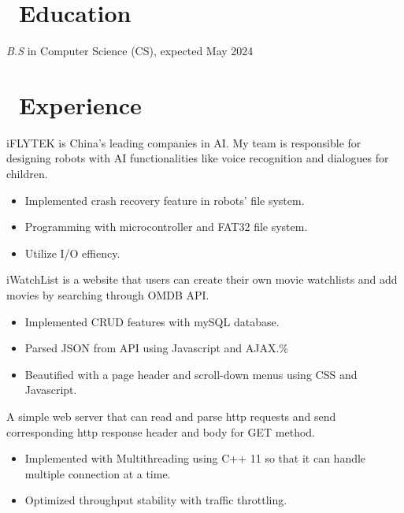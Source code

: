 \documentclass{resume}
\begin{document}



\section{\faGraduationCap\ Education}
\textit{B.S} in Computer Science (CS), expected May 2024

\section{\faUsers\ Experience}
  iFLYTEK is China's leading companies in AI. My team is responsible for designing robots with AI functionalities like voice recognition and dialogues for children.
\begin{itemize}
  \item Implemented crash recovery feature in robots' file system.
  \item Programming with microcontroller and FAT32 file system.
  \item Utilize I/O effiency.
\end{itemize}

  iWatchList is a website that users can create their own movie watchlists and add movies by searching through OMDB API.
\begin{itemize}
  \item Implemented CRUD features with mySQL database.
  \item Parsed JSON from API using Javascript and AJAX.\%
  \item Beautified with a page header and scroll-down menus using CSS and Javascript.
\end{itemize}

  A simple web server that can read and parse http requests and send corresponding http response header and body for GET method.
\begin{itemize}
  \item Implemented with Multithreading using C++ 11 so that it can handle multiple connection at a time.
  \item Optimized throughput stability with traffic throttling.
\end{itemize}
\end{document}
